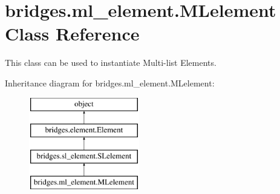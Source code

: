 \hypertarget{classbridges_1_1ml__element_1_1_m_lelement}{}\section{bridges.\+ml\+\_\+element.\+M\+Lelement Class Reference}
\label{classbridges_1_1ml__element_1_1_m_lelement}


This class can be used to instantiate Multi-\/list Elements.  


Inheritance diagram for bridges.\+ml\+\_\+element.\+M\+Lelement\+:\begin{figure}[H]
\begin{center}
\leavevmode
\includegraphics[height=4.000000cm]{classbridges_1_1ml__element_1_1_m_lelement}
\end{center}
\end{figure}
